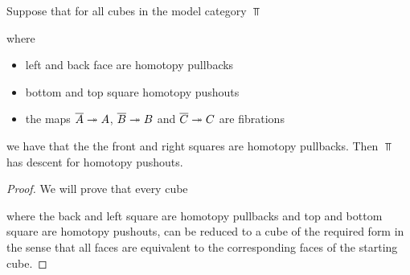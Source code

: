 \begin{lemma}\label{lem:reductionStepDescent}
    Suppose that for all cubes in the model category $\Top$
    \begin{center}
    \end{center}
    where
    \begin{itemize}
        \item left and back face are homotopy pullbacks
        \item bottom and top square homotopy pushouts 
        \item the maps $\overline{A}\xtwoheadrightarrow{} A$, $\overline{B}\xtwoheadrightarrow{} B$ and $\overline{C}\xtwoheadrightarrow{} C$ are fibrations
    \end{itemize}
    we have that the the front and right squares are homotopy pullbacks.
    Then $\Top$ has descent for homotopy pushouts.
    \begin{proof}
        We will prove that every cube
        \begin{center}
        \end{center}
        where the back and left square are homotopy pullbacks and top and bottom square are homotopy pushouts, can be reduced to a cube of the required form in the sense that all faces are equivalent to the corresponding faces of the starting cube.


\end{proof}
\end{lemma}
